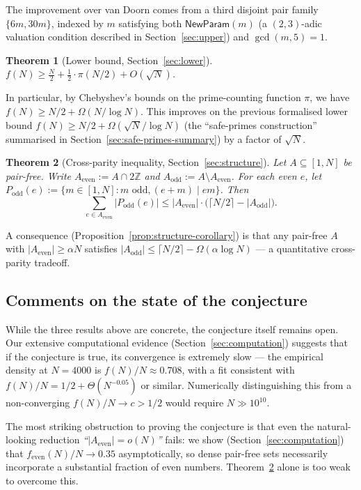 \documentclass[11pt]{amsart}
\theoremstyle{plain}
\newtheorem{theorem}{Theorem}[section]
\theoremstyle{definition}
\newcommand{\Z}{\mathbb{Z}}
\newcommand{\np}{\mathsf{NewParam}}
\begin{document}
The improvement over van Doorn comes from a third disjoint pair family $\{6m, 30m\}$, indexed by $m$ satisfying both $\np(m)$ (a $(2, 3)$-adic valuation condition described in Section~\ref{sec:upper}) and $\gcd(m, 5) = 1$.

\begin{theorem}[Lower bound, Section~\ref{sec:lower}]\label{thm:largeprimes}
$f(N) \geq \tfrac{N}{2} + \tfrac{1}{2} \cdot \pi(N/2) + O(\sqrt{N})$.
\end{theorem}

In particular, by Chebyshev's bounds on the prime-counting function $\pi$, we have $f(N) \geq N/2 + \Omega(N/\log N)$. This improves on the previous formalised lower bound $f(N) \geq N/2 + \Omega(\sqrt{N}/\log N)$ (the ``safe-primes construction'' summarised in Section~\ref{sec:safe-primes-summary}) by a factor of $\sqrt{N}$.

\begin{theorem}[Cross-parity inequality, Section~\ref{sec:structure}]\label{thm:crossparity}
Let $A \subseteq [1, N]$ be pair-free. Write $A_{\text{even}} := A \cap 2\Z$ and $A_{\text{odd}} := A \setminus A_{\text{even}}$. For each even $e$, let $P_{\text{odd}}(e) := \{m \in [1, N] : m \text{ odd}, (e + m) \mid em\}$. Then
\[
  \sum_{e \in A_{\text{even}}} |P_{\text{odd}}(e)| \leq |A_{\text{even}}| \cdot \bigl(\lceil N/2 \rceil - |A_{\text{odd}}|\bigr).
\]
\end{theorem}

A consequence (Proposition~\ref{prop:structure-corollary}) is that any pair-free $A$ with $|A_{\text{even}}| \geq \alpha N$ satisfies $|A_{\text{odd}}| \leq \lceil N/2 \rceil - \Omega(\alpha \log N)$ --- a quantitative cross-parity tradeoff.

\subsection{Comments on the state of the conjecture}

While the three results above are concrete, the conjecture itself remains open. Our extensive computational evidence (Section~\ref{sec:computation}) suggests that if the conjecture is true, its convergence is extremely slow --- the empirical density at $N = 4000$ is $f(N)/N \approx 0.708$, with a fit consistent with $f(N)/N = 1/2 + \Theta(N^{-0.05})$ or similar. Numerically distinguishing this from a non-converging $f(N)/N \to c > 1/2$ would require $N \gg 10^{10}$.

The most striking obstruction to proving the conjecture is that even the natural-looking reduction \emph{``$|A_{\text{even}}| = o(N)$''} fails: we show (Section~\ref{sec:computation}) that $f_{\text{even}}(N) / N \to 0.35$ asymptotically, so dense pair-free sets necessarily incorporate a substantial fraction of even numbers. Theorem~\ref{thm:crossparity} alone is too weak to overcome this.
\end{document}
